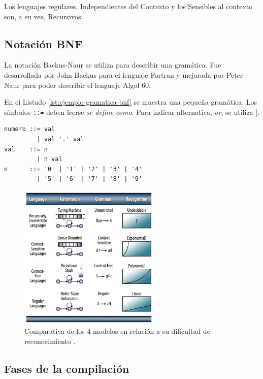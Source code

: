 Los lenguajes regulares, Independientes del Contexto y los Sensibles al contexto son, a su vez, Recursivos.

\subsection{Notación BNF}

La notación Backus-Naur se utiliza para describir una gramática. Fue desarrollada por John Backus para el lenguaje Fortran y mejorada por Peter Naur para poder describir el lenguaje Algol 60.

En el Listado \ref{lst:ejemplo-gramatica-bnf} se muestra una pequeña gramática. Los símbolos \verb|::=| deben leerse \emph{se define como}. Para indicar alternativa, \emph{or}, se utiliza \verb|||.

\begin{lstlisting}[caption={Gramática en notación BNF.},label=lst:ejemplo-gramatica-bnf]
numero ::= val
         | val '.' val
val    ::= n
         | n val
n      ::= '0' | '1' | '2' | '3' | '4'
         | '5' | '6' | '7' | '8' | '9'
\end{lstlisting}

\begin{figure}[hp!]
    \centering
    \includegraphics[width=0.6\textwidth]{imaxes/c-bases-teoricas/hauser-2016.png}
    \caption{Comparativa de los 4 modelos en relación a su dificultad de reconocimiento \cite{teoriaCompiladores_hauser_automatas}.}
    \label{fig:hauser-2016}
\end{figure}

\subsection{Fases de la compilación}

